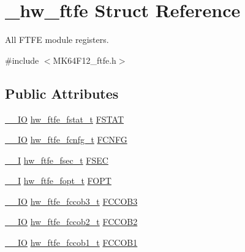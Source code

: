 \hypertarget{struct__hw__ftfe}{}\section{\+\_\+hw\+\_\+ftfe Struct Reference}
\label{struct__hw__ftfe}


All F\+T\+FE module registers.  




{\ttfamily \#include $<$M\+K64\+F12\+\_\+ftfe.\+h$>$}

\subsection*{Public Attributes}
\begin{DoxyCompactItemize}
\item 
\hyperlink{core__sc300_8h_aec43007d9998a0a0e01faede4133d6be}{\+\_\+\+\_\+\+IO} \hyperlink{union__hw__ftfe__fstat}{hw\+\_\+ftfe\+\_\+fstat\+\_\+t} \hyperlink{struct__hw__ftfe_a70891ecfcb89480b7f44c8d577055141}{F\+S\+T\+AT}
\item 
\hyperlink{core__sc300_8h_aec43007d9998a0a0e01faede4133d6be}{\+\_\+\+\_\+\+IO} \hyperlink{union__hw__ftfe__fcnfg}{hw\+\_\+ftfe\+\_\+fcnfg\+\_\+t} \hyperlink{struct__hw__ftfe_a8ad8aa63f1cd335a4dcb2aedc391fb56}{F\+C\+N\+FG}
\item 
\hyperlink{core__sc300_8h_af63697ed9952cc71e1225efe205f6cd3}{\+\_\+\+\_\+I} \hyperlink{union__hw__ftfe__fsec}{hw\+\_\+ftfe\+\_\+fsec\+\_\+t} \hyperlink{struct__hw__ftfe_afe347c281e95fbb6ed7c410955a5b0a1}{F\+S\+EC}
\item 
\hyperlink{core__sc300_8h_af63697ed9952cc71e1225efe205f6cd3}{\+\_\+\+\_\+I} \hyperlink{union__hw__ftfe__fopt}{hw\+\_\+ftfe\+\_\+fopt\+\_\+t} \hyperlink{struct__hw__ftfe_aad205e18b5155b62146a83e39d390eaa}{F\+O\+PT}
\item 
\hyperlink{core__sc300_8h_aec43007d9998a0a0e01faede4133d6be}{\+\_\+\+\_\+\+IO} \hyperlink{union__hw__ftfe__fccob3}{hw\+\_\+ftfe\+\_\+fccob3\+\_\+t} \hyperlink{struct__hw__ftfe_a68a3ec45aa4728737cd5eef993c159ce}{F\+C\+C\+O\+B3}
\item 
\hyperlink{core__sc300_8h_aec43007d9998a0a0e01faede4133d6be}{\+\_\+\+\_\+\+IO} \hyperlink{union__hw__ftfe__fccob2}{hw\+\_\+ftfe\+\_\+fccob2\+\_\+t} \hyperlink{struct__hw__ftfe_a22e53e04428de647b83135c0a11cffd5}{F\+C\+C\+O\+B2}
\item 
\hyperlink{core__sc300_8h_aec43007d9998a0a0e01faede4133d6be}{\+\_\+\+\_\+\+IO} \hyperlink{union__hw__ftfe__fccob1}{hw\+\_\+ftfe\+\_\+fccob1\+\_\+t} \hyperlink{struct__hw__ftfe_a60995233091086ff781beeefc771194b}{F\+C\+C\+O\+B1}

\end{DoxyCompactItemize}
